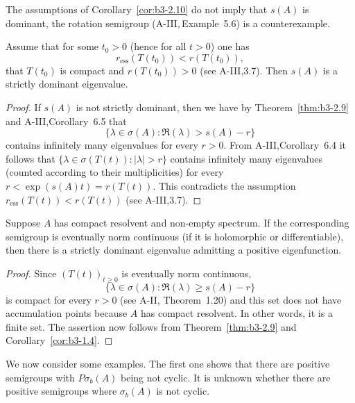 The assumptions of Corollary~\ref{cor:b3-2.10} do not imply that $s(A)$ is dominant, the rotation semigroup (A-III,\,Example~5.6) is a counterexample.
\begin{corollary}\label{cor:b3-2.11}
	Assume that for some $t_{0} > 0$ (hence for all $t > 0$) one has 
    \[
    r_{\text{ess}}(T(t_{0})) < r(T(t_{0})), 
    \]
    \eg that $T(t_{0})$ is compact and $r(T(t_{0})) > 0$ (see A-III,3.7).
	Then $s(A)$ is a strictly dominant eigenvalue.
\end{corollary}
\begin{proof}
	If $s(A)$ is not strictly dominant, then we have by Theorem~\ref{thm:b3-2.9} and A-III,Corollary~6.5 that 
    \[
    \{\lambda \in \sigma(A) \colon \Re(\lambda) > s(A) - r\}
    \]
    contains infinitely many eigenvalues for every $r > 0$.
	From A-III,Corollary~6.4 it follows that $\{\lambda \in \sigma(T(t)) \colon |\lambda| > r\}$ contains infinitely many eigenvalues (counted according to their multiplicities) for every $r < \exp(s(A)t) = r(T(t))$.
	This contradicts the assumption $r_{\text{ess}}(T(t)) < r(T(t))$ (see A-III,3.7).
\end{proof}
\begin{corollary}\label{cor:b3-2.12}
	Suppose $A$ has compact resolvent and non-empty spectrum.
	If the corresponding semigroup is eventually norm continuous (\eg if it is holomorphic or differentiable), then there is a strictly dominant eigenvalue admitting a positive eigenfunction.
\end{corollary}
\begin{proof}
	Since $(T(t))_{t \geq 0}$ is eventually norm continuous, 
    \[
    \{\lambda \in \sigma(A) \colon \Re(\lambda) \geq s(A)-r\}
    \]
    is compact for every $r > 0$ (see A-II, Theorem~1.20) and this set does not have accumulation points because $A$ has compact resolvent.
	In other words, it is a finite set.
	The assertion now follows from Theorem~\ref{thm:b3-2.9} and Corollary~\ref{cor:b3-1.4}.
\end{proof}
We now consider some examples. 
The first one shows that there are positive semigroups with $P\sigma_{b}(A)$ being not cyclic.
It is unknown whether there are positive semigroups where $\sigma_{b}(A)$ is not cyclic.
